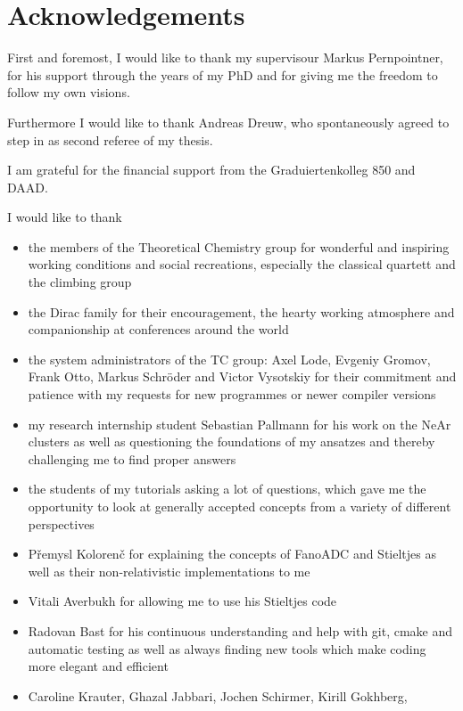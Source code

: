 \chapter*{Acknowledgements}

First and foremost, I would like to thank my supervisour Markus Pernpointner,
for his support through the years of my PhD and for giving me the freedom to
follow my own visions.

Furthermore I would like to thank Andreas Dreuw, who spontaneously agreed to
step in as second referee of my thesis.

I am grateful for the financial support from the Graduiertenkolleg 850 and DAAD.

I would like to thank
\begin{itemize}
 \item the members of the Theoretical Chemistry group for wonderful and
       inspiring working conditions and social recreations, especially
       the classical quartett and the climbing group
 \item the Dirac family for their encouragement, the hearty working
       atmosphere and companionship at conferences around the world
 \item the system administrators of the TC group:
       Axel Lode, Evgeniy Gromov, Frank Otto,
       Markus Schröder and Victor Vysotskiy for their commitment and patience
       with my requests for new programmes or newer compiler versions
 \item my research internship student Sebastian Pallmann for his work
       on the NeAr clusters as well as questioning the foundations of my ansatzes
       and thereby challenging me to find proper answers
 \item the students of my tutorials asking a lot of questions, which gave
       me the opportunity to look at generally accepted concepts from
       a variety of different perspectives
 \item P\v{r}emysl Koloren\v{c} for explaining the concepts of FanoADC
       and Stieltjes as well as their non-relativistic implementations to me
 \item Vitali Averbukh for allowing me to use his Stieltjes code
 \item Radovan Bast for his continuous understanding and help with git,
       cmake and automatic testing as well as always finding 
       new tools which make coding more elegant and efficient
 \item Caroline Krauter, Ghazal Jabbari, Jochen Schirmer, Kirill Gokhberg,

\end{itemize}
